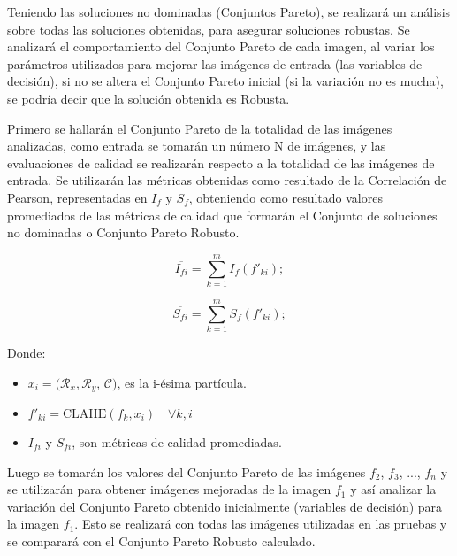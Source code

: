 Teniendo las soluciones no dominadas (Conjuntos Pareto), se realizará un análisis sobre todas las soluciones obtenidas, para asegurar soluciones robustas. 
Se analizará el comportamiento del Conjunto Pareto de cada imagen, al variar los parámetros utilizados para mejorar las imágenes de entrada (las variables de decisión), si no se altera el Conjunto Pareto inicial (si la variación no es mucha), se podría decir que la solución obtenida es Robusta.

Primero se hallarán el Conjunto Pareto de la totalidad de las imágenes analizadas, como entrada se tomarán un número N de imágenes, y las evaluaciones de calidad se realizarán respecto a la totalidad de las imágenes de entrada. Se utilizarán las métricas obtenidas como resultado de la Correlación de Pearson, representadas en $I_f$ y $S_f$, obteniendo como resultado valores promediados de las métricas de calidad que formarán el Conjunto de soluciones no dominadas o Conjunto Pareto Robusto.

\begin{equation}\label{eq:optRobustaI}
     \overline{I_{fi}}=\sum_{k=1}^{m}I_f(f'_{ki});
\end{equation}

\begin{equation}\label{eq:optRobustaS}
     \overline{S_{fi}}=\sum_{k=1}^{m} S_f(f'_{ki});
\end{equation}

Donde:
\begin{itemize}
\item ${x_i}=(\mathcal{R}_x, \mathcal{R}_y$, $\mathscr{C})$, es la i-ésima partícula.
\item $f'_{ki} = \text{CLAHE}(f_k,x_i) \quad \forall k,i$
\item $\overline{I_{fi}}$ y $\overline{S_{fi}}$, son métricas de calidad promediadas.
\end{itemize}

Luego se tomarán los valores del Conjunto Pareto de las imágenes $f_2$, $f_3$, ..., $f_n$ y se utilizarán para obtener imágenes mejoradas de la imagen $f_1$ y así analizar la variación del Conjunto Pareto obtenido inicialmente (variables de decisión) para la imagen $f_1$. Esto se realizará con todas las imágenes utilizadas en las pruebas y se comparará con el Conjunto Pareto Robusto calculado.

